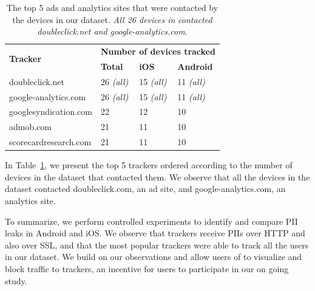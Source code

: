 \begin{table}
\centering
\begin{small}
\begin{tabular}{|p{}|p{}|p{}|p{}|}
\hline
\multirow{2}{*}{\bf Tracker} & \multicolumn{3}{c|}{\bf Number of devices tracked}\tabularnewline
\cline{2-4}
                      &  {\bf Total} & {\bf iOS} & {\bf Android} \tabularnewline
\hline
doubleclick.net       & 26 {\em(all)} & 15 {\em(all)} & 11 {\em(all)} \tabularnewline
\hline
google-analytics.com  & 26 {\em(all)} & 15 {\em(all)}  & 11 {\em(all)} \tabularnewline
\hline
googlesyndication.com & 22 & 12 & 10 \tabularnewline
\hline
admob.com             & 21 & 11 & 10 \tabularnewline
\hline
scorecardresearch.com &  21 & 11 & 10 \tabularnewline
\hline
\end{tabular}
\end{small}
\caption{The top 5 ads and analytics sites that were contacted by the devices in our dataset.
\emph{All 26 devices in} \mobWild \emph{contacted doubleclick.net and google-analytics.com}.}
\vspace{\postfigspace}
\label{tab:top-trackers}
\end{table}

In Table~\ref{tab:top-trackers}, we present the top 5 trackers ordered according to the number of devices in the \mobWild dataset that contacted them.
We observe that all the devices in the \mobWild dataset contacted doubleclick.com, an ad site, and google-analytics.com, an analytics site. 

To summarize, we perform controlled experiments to identify and compare PII leaks in Android and iOS. 
We observe that trackers receive PIIs over HTTP and also over SSL, and that the most popular trackers were able to track all the users in our \mobWild dataset.
We build on our observations and allow users of \meddle to visualize and block traffic to trackers, an incentive for users to participate in our on going study. 


